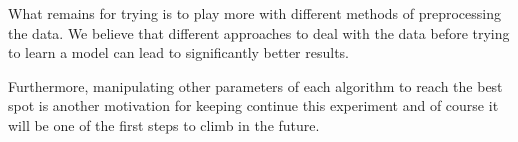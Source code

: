 What remains for trying is to play more with different methods of preprocessing
the data. We believe that different approaches to deal with the data before
trying to learn a model can lead to significantly better results.

Furthermore, manipulating other parameters of each algorithm to reach the best
spot is another motivation for keeping continue this experiment and of course it
will be one of the first steps to climb in the future.

